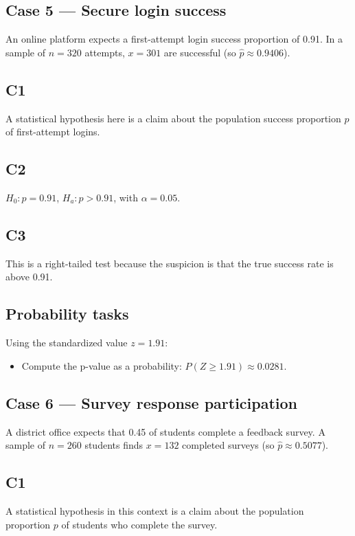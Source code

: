\begin{ExamProblems}
		\item
		\subsection*{Case 5 — Secure login success}
		An online platform expects a first-attempt login success proportion of 0.91. In a sample of \(n=320\) attempts, \(x=301\) are successful (so \(\hat p\approx 0.9406\)).

		\subsection*{C1}
		A statistical hypothesis here is a claim about the population success proportion \(p\) of first-attempt logins.

		\subsection*{C2}
		\(H_0\colon p=0.91\), \(H_a\colon p>0.91\), with \(\alpha=0.05\).

		\subsection*{C3}
		This is a right-tailed test because the suspicion is that the true success rate is above 0.91.

		\subsection*{Probability tasks}
		Using the standardized value \(z=1.91\):
		\begin{itemize}
			\item Compute the p-value as a probability: \(P(Z\ge 1.91)\approx 0.0281\).
		\end{itemize}

		\item
		\subsection*{Case 6 — Survey response participation}
		A district office expects that 0.45 of students complete a feedback survey. A sample of \(n=260\) students finds \(x=132\) completed surveys (so \(\hat p\approx 0.5077\)).

		\subsection*{C1}
		A statistical hypothesis in this context is a claim about the population proportion \(p\) of students who complete the survey.


\end{ExamProblems}
